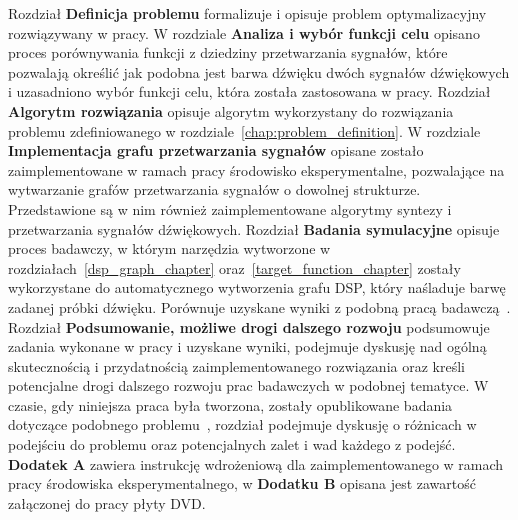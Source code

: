 Rozdział \textbf{Definicja problemu} formalizuje i opisuje problem optymalizacyjny rozwiązywany w pracy.
W rozdziale \textbf{Analiza i wybór funkcji celu} opisano proces porównywania funkcji z dziedziny przetwarzania sygnałów,
które pozwalają określić jak podobna jest barwa dźwięku dwóch sygnałów dźwiękowych i
uzasadniono wybór funkcji celu, która została zastosowana w pracy.
Rozdział \textbf{Algorytm rozwiązania} opisuje algorytm wykorzystany do rozwiązania problemu
zdefiniowanego w rozdziale~\ref{chap:problem_definition}.
W rozdziale \textbf{Implementacja grafu przetwarzania sygnałów} opisane zostało zaimplementowane w ramach pracy środowisko eksperymentalne,
pozwalające na wytwarzanie grafów przetwarzania sygnałów o dowolnej strukturze.
Przedstawione są w nim również zaimplementowane algorytmy syntezy i przetwarzania sygnałów dźwiękowych.
Rozdział \textbf{Badania symulacyjne} opisuje proces badawczy, w którym narzędzia wytworzone w
rozdziałach~\ref{dsp_graph_chapter} oraz~\ref{target_function_chapter}
zostały wykorzystane do automatycznego wytworzenia grafu DSP, który naśladuje barwę zadanej próbki dźwięku.
Porównuje uzyskane wyniki z podobną pracą badawczą~\cite{evolutionary_puredata}.
Rozdział \textbf{Podsumowanie, możliwe drogi dalszego rozwoju} podsumowuje zadania wykonane w pracy i uzyskane wyniki,
podejmuje dyskusję nad ogólną skutecznością i przydatnością zaimplementowanego rozwiązania oraz
kreśli potencjalne drogi dalszego rozwoju prac badawczych w podobnej tematyce. W czasie, gdy niniejsza praca była tworzona, zostały opublikowane badania
dotyczące podobnego problemu~\cite{ieee_synth_programming}, rozdział podejmuje dyskusję o różnicach w podejściu do problemu oraz potencjalnych
zalet i wad każdego z podejść. \textbf{Dodatek A} zawiera instrukcję wdrożeniową dla
zaimplementowanego w ramach pracy środowiska eksperymentalnego, w \textbf{Dodatku B}
opisana jest zawartość załączonej do pracy płyty DVD\@.

